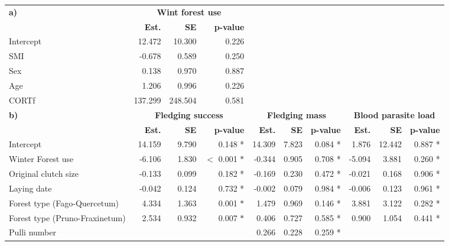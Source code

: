 \documentclass[10pt, twoside]{book} %
\begin{document}
\begin{landscape}
\begin{table}
\begin{center}
\begin{footnotesize}
\begin{tabular}{l r r r r r r r r r}
				\toprule
				\textbf{a)} & \multicolumn{3}{c}{\textbf{Wint forest use}} &&&&&&\\
				\cmidrule{2-4}
				& \textbf{Est.} & \textbf{SE} & \textbf{p-value} &&&&&&\\ 
				\cmidrule(r){1-4}
				Intercept & 12.472 & 10.300 & 0.226 &&&&&&\\
				SMI & -0.678 & 0.589 & 0.250 &&&&&&\\
				Sex & 0.138 & 0.970 & 0.887&&&&&&\\
				Age & 1.206 & 0.996 & 0.226 &&&&&&\\
				CORTf & 137.299 & 248.504 & 0.581 &&&&&&\\
				\cmidrule{1-4}
				\textbf{b)} & \multicolumn{3}{c}{\textbf{Fledging success}} & \multicolumn{3}{c}{\textbf{Fledging mass}} & \multicolumn{3}{c}{\textbf{Blood parasite load}}\\
				\cmidrule(r){2-4} \cmidrule(r){5-7} \cmidrule(r){8-10}
				& \textbf{Est.} & \textbf{SE} & \textbf{p-value} & \textbf{Est.} & \textbf{SE} & \textbf{p-value} & \textbf{Est.} & \textbf{SE} & \textbf{p-value}\\
				\hline
				Intercept & 14.159 & 9.790 & 0.148 \color{white}*\color{black}& 14.309 & 7.823 & 0.084 \color{white}*\color{black} & 1.876 & 12.442 & 0.887 \color{white}*\color{black}\\
				Winter Forest use & -6.106 & 1.830 & $<$ 0.001 $\ast$ & -0.344 & 0.905 & 0.708 \color{white}*\color{black} & -5.094 & 3.881 & 0.260 \color{white}*\color{black}\\
				Original clutch size & -0.133 & 0.099 & 0.182 \color{white}*\color{black} & -0.169 & 0.230 & 0.472 \color{white}*\color{black} & -0.021 & 0.168 & 0.906 \color{white}*\color{black}\\
				Laying date &  -0.042 & 0.124 & 0.732 \color{white}*\color{black} & -0.002 & 0.079 & 0.984 \color{white}*\color{black} & -0.006 & 0.123 & 0.961 \color{white}*\color{black}\\
				Forest type (Fago-Quercetum) & 4.334 & 1.363 & 0.001 $\ast$ & 1.479 & 0.969 & 0.146 \color{white}*\color{black} & 3.881 & 3.122 & 0.282 \color{white}*\color{black}\\
				Forest type (Pruno-Fraxinetum) & 2.534 & 0.932 & 0.007 $\ast$ & 0.406 & 0.727 & 0.585 \color{white}*\color{black} & 0.900 & 1.054 & 0.441 \color{white}*\color{black}\\
				Pulli number &&&& 0.266 & 0.228 & 0.259 \color{white}*\color{black}
				 &&&\\
				\bottomrule
				
			\end{tabular}\endgroup
		\end{footnotesize}
	\end{center}
\end{table}
\end{landscape}
\end{document}
